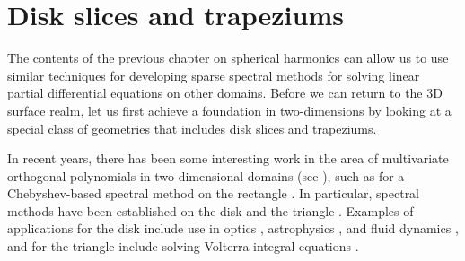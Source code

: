 

\chapter{Disk slices and trapeziums}\label{CHAPTER:diskslice}

The contents of the previous chapter on spherical harmonics can allow us to use similar techniques for developing sparse spectral methods for solving linear partial differential equations on other domains. Before we can return to the 3D surface realm, let us first achieve a foundation in two-dimensions by looking at a special class of geometries that includes disk slices and trapeziums.

In recent years, there has been some interesting work in the area of multivariate orthogonal polynomials in two-dimensional domains (see \cite{dunkl2014orthogonal}), such as for a Chebyshev-based spectral method on the rectangle \cite{julien2009efficient}. In particular, spectral methods have been established on the disk \cite{boyd2011comparing, vasil2016tensor} and the triangle \cite{olver2019triangle}. Examples of applications for the disk include use in optics \cite{mahajan2007orthonormal}, astrophysics \cite{pringle1981accretion}, and fluid dynamics \cite{eggels1994fully, noll1976zernike, kerswell2005recent}, and for the triangle include solving Volterra integral equations \cite{gutleb2020sparse}. 


